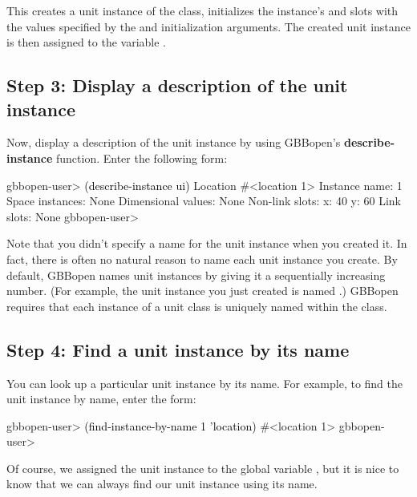 \documentclass[10pt,twoside,english,pdftex]{article}
\begin{document}
This creates a unit instance of the  class, initializes the
instance's  and  slots with the values specified by the
 and  initialization arguments.  The created unit instance
is then assigned to the variable .

\subsection*{Step 3: Display a description of the unit instance}

%
%
%
Now, display a description of the unit instance by using GBBopen's
\textbf{describe-instance} function.  Enter the following form:
%
\W\supp
\begin{example}
\textcolor{darkergray}{%
  gbbopen-user> \textcolor{black}{(describe-instance ui)}
  Location #<location 1>
    Instance name: 1
    Space instances: None
    Dimensional values: None
    Non-link slots:
      x:  40
      y:  60
    Link slots: None
  gbbopen-user>}
\end{example}

Note that you didn't specify a name for the unit instance when you created it.
In fact, there is often no natural reason to name each unit instance you
create. By default, GBBopen names unit instances by giving it a sequentially
increasing number.  (For example, the unit instance you just created is named
.)  GBBopen requires that each instance of a unit class is uniquely
named within the class.

\subsection*{Step 4: Find a unit instance by its name}

%
%
%
You can look up a particular unit instance by its name. For example, to
find the   unit instance by name, enter the form:
%
\W\supp
\begin{example}
\textcolor{darkergray}{%
  gbbopen-user> \textcolor{black}{(find-instance-by-name 1 'location)}
  #<location 1>
  gbbopen-user>}
\end{example}

Of course, we assigned the  unit instance to the global
variable , but it is nice to know that we can always find our unit
instance using its name.
\end{document}
